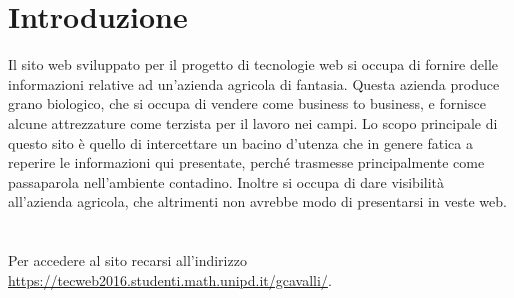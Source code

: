 \newpage
\section{Introduzione}
Il sito web sviluppato per il progetto di tecnologie web si occupa di fornire delle informazioni relative ad un'azienda agricola di fantasia. Questa azienda produce grano biologico, che si occupa di vendere come business to business, e fornisce alcune attrezzature come terzista per il lavoro nei campi.
Lo scopo principale di questo sito è quello di intercettare un bacino d'utenza che in genere fatica a reperire le informazioni qui presentate, perché trasmesse principalmente come passaparola nell'ambiente contadino. Inoltre si occupa di dare visibilità all'azienda agricola, che altrimenti non avrebbe modo di presentarsi in veste web.
~\\ ~\\
Per accedere al sito recarsi all'indirizzo \url{https://tecweb2016.studenti.math.unipd.it/gcavalli/}.